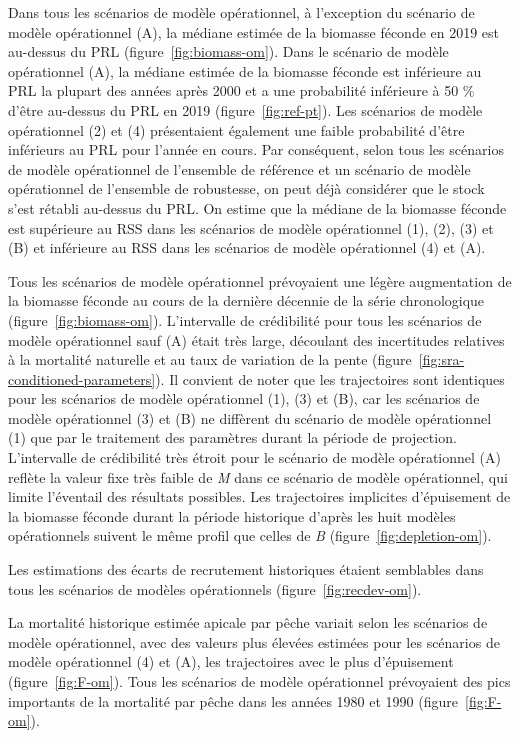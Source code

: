 \documentclass[french,11pt]{book}
\begin{document}
Dans tous les scénarios de modèle opérationnel, à l'exception du scénario de modèle opérationnel (A), la médiane estimée de la biomasse féconde en 2019 est au-dessus du PRL (figure~\ref{fig:biomass-om}). Dans le scénario de modèle opérationnel (A), la médiane estimée de la biomasse féconde est inférieure au PRL la plupart des années après 2000 et a une probabilité inférieure à 50 \% d'être au-dessus du PRL en 2019 (figure~\ref{fig:ref-pt}). Les scénarios de modèle opérationnel (2) et (4) présentaient également une faible probabilité d'être inférieurs au PRL pour l'année en cours. Par conséquent, selon tous les scénarios de modèle opérationnel de l'ensemble de référence et un scénario de modèle opérationnel de l'ensemble de robustesse, on peut déjà considérer que le stock s'est rétabli au-dessus du PRL. On estime que la médiane de la biomasse féconde est supérieure au RSS dans les scénarios de modèle opérationnel (1), (2), (3) et (B) et inférieure au RSS dans les scénarios de modèle opérationnel (4) et (A).

Tous les scénarios de modèle opérationnel prévoyaient une légère augmentation de la biomasse féconde au cours de la dernière décennie de la série chronologique (figure~\ref{fig:biomass-om}). L'intervalle de crédibilité pour tous les scénarios de modèle opérationnel sauf (A) était très large, découlant des incertitudes relatives à la mortalité naturelle et au taux de variation de la pente (figure~\ref{fig:sra-conditioned-parameters}). Il convient de noter que les trajectoires sont identiques pour les scénarios de modèle opérationnel (1), (3) et (B), car les scénarios de modèle opérationnel (3) et (B) ne diffèrent du scénario de modèle opérationnel (1) que par le traitement des paramètres durant la période de projection. L'intervalle de crédibilité très étroit pour le scénario de modèle opérationnel (A) reflète la valeur fixe très faible de \emph{M} dans ce scénario de modèle opérationnel, qui limite l'éventail des résultats possibles. Les trajectoires implicites d'épuisement de la biomasse féconde durant la période historique d'après les huit modèles opérationnels suivent le même profil que celles de \emph{B} (figure~\ref{fig:depletion-om}).

Les estimations des écarts de recrutement historiques étaient semblables dans tous les scénarios de modèles opérationnels (figure~\ref{fig:recdev-om}).

La mortalité historique estimée apicale par pêche variait selon les scénarios de modèle opérationnel, avec des valeurs plus élevées estimées pour les scénarios de modèle opérationnel (4) et (A), les trajectoires avec le plus d'épuisement (figure~\ref{fig:F-om}). Tous les scénarios de modèle opérationnel prévoyaient des pics importants de la mortalité par pêche dans les années 1980 et 1990 (figure~\ref{fig:F-om}).
\end{document}
